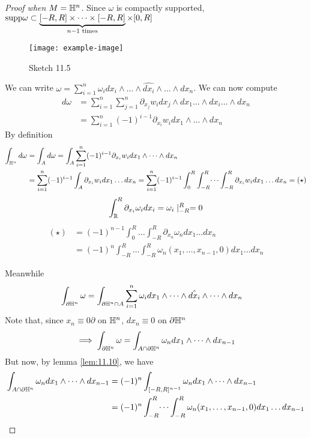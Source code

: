 \begin{proof}[Proof when \(M=\mathbb{H}^n\)]
Since \(\omega\) is compactly supported, \(\text{supp} \omega\subset \underbrace{[-R,R]\times\dots\times  [-R,R]}_{n-1\text{ times}}\times [0,R]\) 
\begin{figure}[H]\label{fig:11.5}
    \centering
    \texttt{[image: example-image]}
    \caption{Sketch 11.5}
\end{figure}   
We can write \(\omega=\sum_{i=1}^n\omega_i dx_i\wedge \dots \wedge \hat{dx_i}\wedge \dots \wedge dx_n\).
We can now compute 
\begin{align*}
    d\omega&=\sum_{i=1}^n\sum_{j=1}^n \partial_{x_j} w_i dx_j\wedge dx_1\dots\wedge dx_i\dots \wedge dx_n\\
    &=\sum_{i=1}^n(-1)^{i-1}\partial_{x_i}w_i dx_1\wedge \dots\wedge dx_n
\end{align*}
By definition 
\begin{align*}
    \int_{\mathbb{H}^n} d\omega &=\int_{A} d\omega=\int_A \sum_{i=1}^n(-1)^{i-1}\partial_{x_i}w_i dx_1\wedge \dots\wedge dx_n\\
    &= \sum_{i=1}^{n} (-1)^{i-1}\int_A \partial_{x_i}w_i dx_1\dots dx_n=\sum_{i=1}^n (-1)^{i-1}\int_0^R\int_{-R}^R\dots \int_{-R}^R\partial_{x_i}w_i dx_1\dots dx_n =(\star)
\end{align*}
 \[\int_{\mathbb{R}}^R \partial_{x_i}\omega_i dx_i=\omega_i\mid_{-R}^R=0\] 
\begin{align*}
    (\star) &= (-1)^{n-1} \int_0^R\dots\int_{-R}^R \partial_{x_n}\omega_n dx_1\dots dx_n\\
    &=(-1)^n\int_{-R}^R\dots \int_{-R}^R \omega_n(x_1,\dots,x_{n-1},0) dx_1\dots dx_n
\end{align*}

Meanwhile 
\begin{align*}
    \int_{\partial \mathbb{H}^n}\omega&=\int_{\partial \mathbb{H}^n\cap A}\sum_{i=1}^n\omega_i dx_1\wedge \dots\wedge \hat{dx_i}\wedge \dots \wedge dx_n
\end{align*}
Note that, since \(x_n\equiv 0\partial\) on \(\mathbb{H}^n\), \(dx_n\equiv 0\) on \(\partial \mathbb{H}^n\)
\begin{align*}
    \implies \int_{\partial \mathbb{H}^n}\omega=\int_{A\cap \partial \mathbb{H}^n}\omega_n dx_1\wedge \dots\wedge  dx_{n-1} 
\end{align*}
But now, by lemma \ref{lem:11.10}, we have 
\begin{align*}
    \int_{A\cap \partial \mathbb{H}^n} \omega_n dx_1\wedge \dots \wedge dx_{n-1}&=(-1)^n \int_{[-R,R]^{n-1}}\omega_ndx_1\wedge \dots \wedge dx_{n-1}\\
    &= (-1)^n \int_{-R}^R\dots \int_{-R}^R \omega_n (x_1,\dots,x_{n-1},0)dx_1\dots dx_{n-1}
\end{align*} 
\end{proof}

